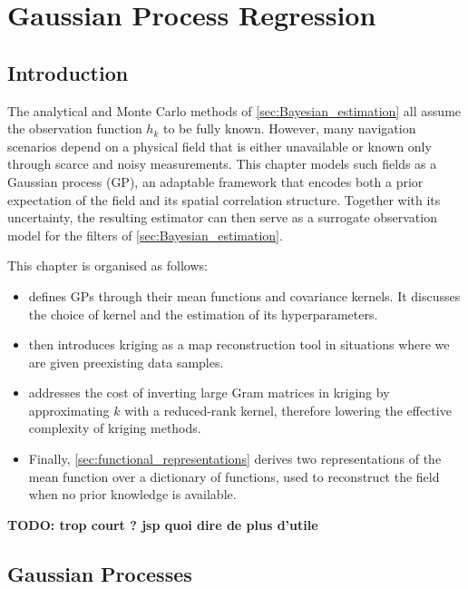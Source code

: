 \chapter{Gaussian Process Regression}\label{sec:Gaussian_processes}

\vfill
\localtableofcontents
\vfill
\newpage

\section{Introduction}

The analytical and Monte Carlo methods of \cref{sec:Bayesian_estimation} all assume the observation function $h_k$ to be fully known. However, many navigation scenarios depend on a physical field that is either unavailable or known only through scarce and noisy measurements. This chapter models such fields as a Gaussian process (GP), an adaptable framework that encodes both a prior expectation of the field and its spatial correlation structure. Together with its uncertainty, the resulting estimator can then serve as a surrogate observation model for the filters of \cref{sec:Bayesian_estimation}.

This chapter is organised as follows:
\begin{itemize}
	\item{} defines GPs through their mean functions and covariance kernels. It discusses the choice of kernel and the estimation of its hyperparameters.
	\item{} then introduces kriging as a map reconstruction tool in situations where we are given preexisting data samples.
	\item{} addresses the cost of inverting large Gram matrices in kriging by approximating $k$ with a reduced-rank kernel, therefore lowering the effective complexity of kriging methods.
	\item Finally, \cref{sec:functional_representations} derives two representations of the mean function over a dictionary of functions, used to reconstruct the field when no prior knowledge is available.
\end{itemize}

\textbf{TODO: trop court ? jsp quoi dire de plus d'utile}

\section{Gaussian Processes}\label{sec:GP_definition}

